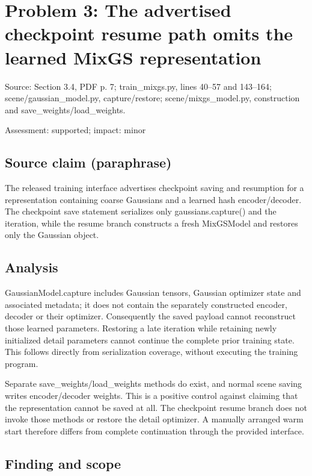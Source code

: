 \documentclass[11pt]{article}
\begin{document}
\section*{Problem 3: The advertised checkpoint resume path omits the learned MixGS representation}

Source: Section 3.4, PDF p. 7; train\_mixgs.py, lines 40–57 and 143–164; scene/gaussian\_model.py, capture/restore; scene/mixgs\_model.py, construction and save\_weights/load\_weights.

Assessment: supported; impact: minor

\subsection*{Source claim (paraphrase)}

The released training interface advertises checkpoint saving and resumption for a representation containing coarse Gaussians and a learned hash encoder/decoder. The checkpoint save statement serializes only gaussians.capture() and the iteration, while the resume branch constructs a fresh MixGSModel and restores only the Gaussian object.

\subsection*{Analysis}

GaussianModel.capture includes Gaussian tensors, Gaussian optimizer state and associated metadata; it does not contain the separately constructed encoder, decoder or their optimizer. Consequently the saved payload cannot reconstruct those learned parameters. Restoring a late iteration while retaining newly initialized detail parameters cannot continue the complete prior training state. This follows directly from serialization coverage, without executing the training program.

Separate save\_weights/load\_weights methods do exist, and normal scene saving writes encoder/decoder weights. This is a positive control against claiming that the representation cannot be saved at all. The checkpoint resume branch does not invoke those methods or restore the detail optimizer. A manually arranged warm start therefore differs from complete continuation through the provided interface.

\subsection*{Finding and scope}
\end{document}
